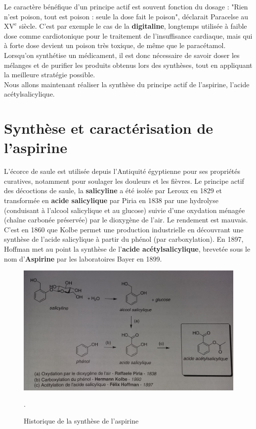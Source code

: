 \documentclass[11pt,a4paper]{report}
\begin{document}
Le caractère bénéfique d'un principe actif est souvent fonction du dosage : "Rien n'est poison, tout est poison : seule la dose fait le poison", déclarait Paracelse au $\text{XV}^\text{e}$ siècle. C'est par exemple le cas de la \textbf{digitaline}, longtemps utilisée à faible dose comme cardiotonique pour le traitement de l'insuffisance cardiaque, mais qui à forte dose devient un poison très toxique, de même que le paracétamol.\\ 

Lorsqu'on synthétise un médicament, il est donc nécessaire de savoir doser les mélanges et de purifier les produits obtenus lors des synthèses, tout en appliquant la meilleure stratégie possible.\\

Nous allons maintenant réaliser la synthèse du principe actif de l'aspirine, l'acide acétylsalicylique. 

\newpage
\section{Synthèse et caractérisation de l'aspirine}\label{sec:2}

L'écorce de saule est utilisée depuis l'Antiquité égyptienne pour ses propriétés curatives, notamment pour soulager les douleurs et les fièvres. Le principe actif des décoctions de saule, la \textbf{salicyline} a été isolée par Leroux en 1829 et transformée en \textbf{acide salicylique} par Piria en 1838 par une hydrolyse (conduisant à l'alcool salicylique et au glucose) suivie d'une oxydation ménagée (chaîne carbonée préservée) par le dioxygène de l'air. Le rendement est mauvais.\\

C'est en 1860 que Kolbe permet une production industrielle en découvrant une synthèse de l'acide salicylique à partir du phénol (par carboxylation). En 1897, Hoffman met au point la synthèse de l'\textbf{acide acétylsalicylique}, brevetée sous le nom d'\textbf{Aspirine} par les laboratoires Bayer en 1899.

\begin{figure}[h!]
\begin{center}
	\includegraphics[scale = 0.1]{historique_aspirine.jpg}
	\caption{Historique de la synthèse de l'aspirine}. 
	\label{fig:historique}
\end{center}
\end{figure}
\end{document}
